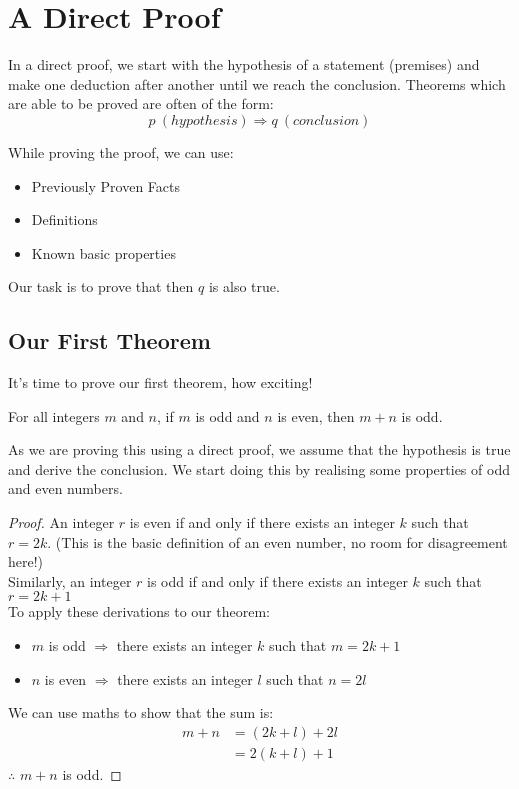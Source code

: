 \section{A Direct Proof}
In a direct proof, we start with the hypothesis of a statement (premises) and make one deduction after another until we reach the conclusion. Theorems which are able to be proved are often of the form:
\[p\ (hypothesis) \Rightarrow q\ (conclusion)\]

While proving the proof, we can use:
\begin{itemize}
    \item Previously Proven Facts
    \item Definitions
    \item Known basic properties
\end{itemize}

Our task is to prove that then $q$ is also true.

\subsection{Our First Theorem}
It's time to prove our first theorem, how exciting!

\begin{theorem}
    For all integers $m$ and $n$, if $m$ is odd and $n$ is even, then $m+n$ is odd.
\end{theorem}
As we are proving this using a direct proof, we assume that the hypothesis is true and derive the conclusion. We start doing this by realising some properties of odd and even numbers.

\begin{proof}
An integer $r$ is even if and only if there exists an integer $k$ such that $r=2k$. (This is the basic definition of an even number, no room for disagreement here!)\\

Similarly, an integer $r$ is odd if and only if there exists an integer $k$ such that $r = 2k + 1$\\

To apply these derivations to our theorem:
\begin{itemize}
    \item[] $m$ is odd $\Rightarrow$ there exists an integer $k$ such that $m=2k + 1$
    \item[] $n$ is even $\Rightarrow$ there exists an integer $l$ such that $n=2l$
\end{itemize}

We can use maths to show that the sum is:
\begin{align*}
    m + n &= (2k+l) +2l\\
    &= 2(k+l)+1
\end{align*}
$\therefore$ $m+n$ is odd.
\end{proof}

